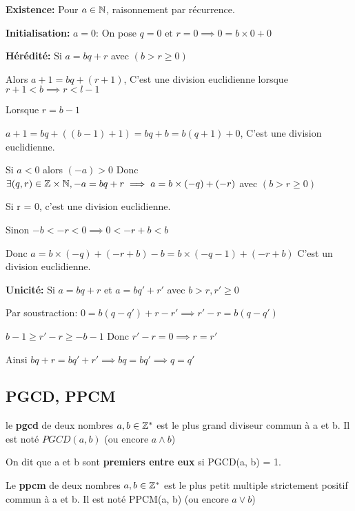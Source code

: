 \documentclass[a4paper, 12pt]{article}
\begin{document}
\begin{demonstration}
    \textbf{Existence:} Pour $a \in \mathbb{N}$, raisonnement par récurrence.

    \textbf{Initialisation:} $a = 0$: On pose $q = 0 \text{ et } r = 0 \implies 0 = b \times 0 + 0$

    \textbf{Hérédité:} Si $a = bq + r$ avec $(b \gt r \geq 0)$

    Alors $a + 1 = bq + (r + 1)$, C'est une division euclidienne lorsque $r+1 \lt b \implies r \lt l - 1$

    Lorsque $r = b-1$

    $a + 1 = bq + ((b - 1) + 1) = bq + b = b(q + 1) + 0$,
    C'est une division euclidienne.

    Si $a \lt 0$ alors $(-a) \gt 0$ Donc $\exists (q, r) \in \mathbb{Z} \times \mathbb{N}, -a = bq + r \implies a = b \times (-q) + (-r)$ avec $(b \gt r \geq 0)$

    Si r = 0, c'est une division euclidienne.

    Sinon $-b \lt -r \lt 0 \implies 0 \lt -r + b \lt b$

    Donc $a = b \times (-q) + (-r + b) - b = b \times (-q - 1) + (-r + b)$
    C'est un division euclidienne.

    \textbf{Unicité:} Si $a = bq + r$ et $a = bq' + r'$ avec $b \gt r, r' \geq 0$

    Par soustraction: $0 = b(q - q') + r - r' \implies r' - r = b(q - q')$

    $b - 1 \geq r' - r \geq -b - 1$
    Donc $r' - r = 0 \implies r = r'$

    Ainsi $bq + r = bq' + r' \implies bq = bq' \implies q = q'$
\end{demonstration}

\subsection{PGCD, PPCM}

\begin{definition}
    le \textbf{pgcd} de deux nombres $a, b \in \mathbb{Z}^*$ est le plus grand diviseur commun à a et b. Il est noté $PGCD(a, b)$ (ou encore $a \land b$)

    On dit que a et b sont \textbf{premiers entre eux} si PGCD(a, b) = 1.

    Le \textbf{ppcm} de deux nombres $a, b \in \mathbb{Z}^*$ est le plus petit multiple strictement positif commun à a et b. Il est noté PPCM(a, b) (ou encore $a \lor b$)
\end{definition}
\end{document}
